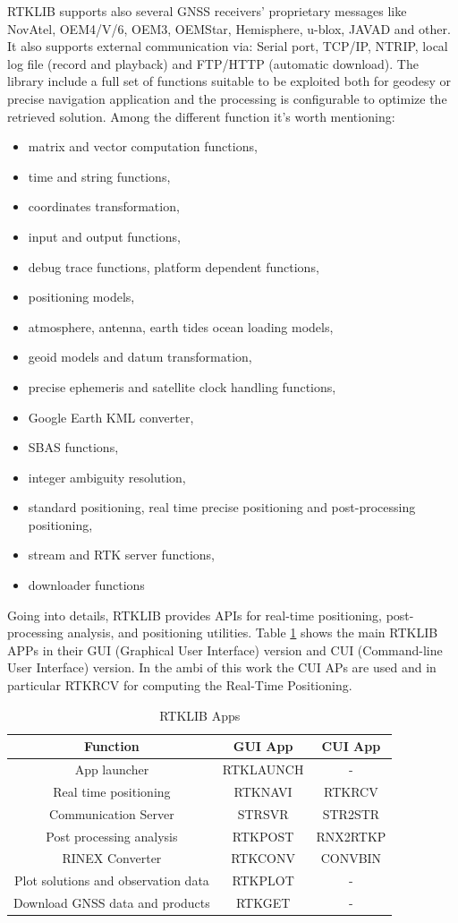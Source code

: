 RTKLIB supports also several GNSS receivers' proprietary messages like NovAtel, OEM4/V/6, OEM3, OEMStar, Hemisphere, u-blox, JAVAD and other. 
It also supports external communication via: Serial port, TCP/IP, NTRIP, local log file (record and playback) and FTP/HTTP (automatic download).
The library include a full set of functions suitable to be exploited both for geodesy or precise navigation application and the processing is configurable to optimize the retrieved solution. 
Among the different function it's worth mentioning: 
\begin{itemize}
\item matrix and vector computation functions,
\item time and string functions,
\item coordinates transformation, 
\item input and output functions,
\item debug trace functions, platform dependent functions, 
\item positioning models, 
\item atmosphere, antenna, earth tides ocean loading models, 
\item geoid models and  datum transformation, 
\item precise ephemeris and satellite clock handling functions, 
\item Google Earth KML converter, 
\item SBAS functions, 
\item integer ambiguity resolution, 
\item standard positioning, real time precise positioning and post-processing positioning, 
\item stream and  RTK server functions, 
\item downloader functions
\end{itemize}
Going into details, RTKLIB provides APIs for real-time positioning, post-processing analysis, and positioning utilities. Table \ref{tab:rtklib_apps} shows the main RTKLIB APPs in their GUI (Graphical User Interface) version and CUI (Command-line User Interface) version. In the ambi of this work the CUI APs are used and in particular RTKRCV for computing the Real-Time Positioning.
\begin{table}[ht]
	\centering
	\begin{tabular}{| c | c| c|}
		\hline
		\textbf{Function} & \textbf{GUI App} & \textbf{CUI App}\\
		\hline 
		App launcher & RTKLAUNCH  & -\\
		\hline
		Real time positioning & RTKNAVI & RTKRCV\\
		\hline
		Communication Server & STRSVR & STR2STR\\     
		\hline	
		Post processing analysis & RTKPOST & RNX2RTKP\\     
		\hline
		RINEX Converter & RTKCONV & CONVBIN\\     
		\hline
		Plot solutions and observation data & RTKPLOT & -\\     
		\hline
		Download GNSS data and products & RTKGET & -\\     
		\hline
	\end{tabular}
\caption{RTKLIB Apps}
\label{tab:rtklib_apps}
\end{table}
